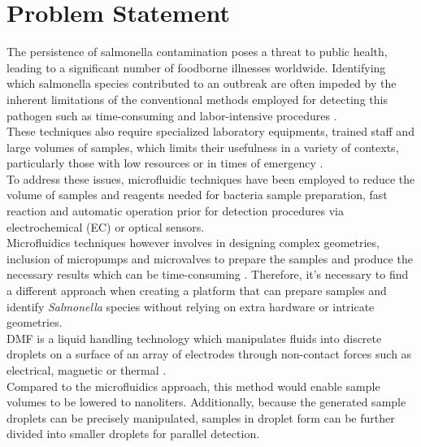 \section{Problem Statement}
The persistence of salmonella contamination poses a threat to public health, leading to a significant number of foodborne illnesses worldwide. Identifying which salmonella species contributed to an outbreak are often impeded by the inherent limitations of the conventional methods employed for detecting this pathogen such as time-consuming and labor-intensive procedures \cite{silvaRecentDevelopmentsLateral2023}.\\

These techniques also require specialized laboratory equipments, trained staff and large volumes of samples, which limits their usefulness in a variety of contexts, particularly those with low resources or in times of emergency \cite{shenBiosensorsRapidDetection2021,wangOverviewRapidDetection2021}.\\

To address these issues, microfluidic techniques have been employed to reduce the volume of samples and reagents needed for bacteria sample preparation, fast reaction and automatic operation \cite{qiMicrofluidicBiosensorRapid2021,nguyenCompleteProtocolRapid2019} prior for detection procedures via electrochemical (EC) or optical sensors. \\

Microfluidics techniques however involves in designing complex geometries, inclusion of micropumps and microvalves to prepare the samples and produce the necessary results which can be time-consuming \cite{suMicrofluidicsBasedBiochipsTechnology2006}. Therefore, it's necessary to find a different approach when creating a platform that can prepare samples and identify \emph{Salmonella} species without relying on  extra hardware or intricate geometries.\\

DMF is a liquid handling technology which manipulates fluids into discrete droplets on a surface of an array of electrodes through non-contact forces such as electrical, magnetic or thermal \cite{nguyenCompleteProtocolRapid2019,qiMicrofluidicBiosensorRapid2021}.\\

Compared to the microfluidics approach, this method would enable sample volumes to be lowered to nanoliters. Additionally, because the generated sample droplets can be precisely manipulated, samples in droplet form can be further divided into smaller droplets for parallel detection.\newpage 

